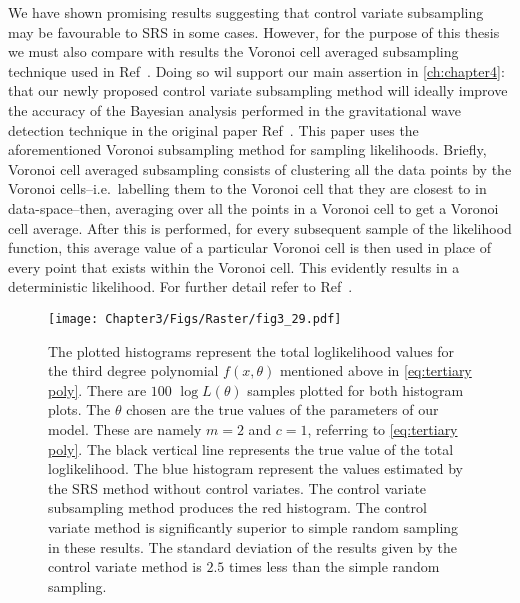 We have shown promising results suggesting that control variate subsampling may be favourable to SRS in some cases. However, for the purpose of this thesis we must also compare with results the Voronoi cell averaged subsampling technique used in Ref~\cite{Mihaylov_2020}. Doing so wil support our main assertion in \cref{ch:chapter4}: that our newly proposed control variate subsampling method will ideally improve the accuracy of the Bayesian analysis performed in the gravitational wave detection technique in the original paper Ref~\cite{Mihaylov_2020}. This paper uses the aforementioned Voronoi subsampling method for sampling likelihoods. Briefly, Voronoi cell averaged subsampling consists of clustering all the data points by the Voronoi cells--i.e.\ labelling them to the Voronoi cell that they are closest to in data-space--then, averaging over all the points in a Voronoi cell to get a Voronoi cell average. After this is performed, for every subsequent sample of the likelihood function, this average value of a particular Voronoi cell is then used in place of every point that exists within the Voronoi cell. This evidently results in a deterministic likelihood. For further detail refer to Ref~\cite{Mihaylov_2020}.


\begin{figure} 
\centering    
\texttt{[image: Chapter3/Figs/Raster/fig3\_29.pdf]}
\caption{ The plotted histograms represent the total loglikelihood values for the third degree polynomial $f(x,\theta)$ mentioned above in \cref{eq:tertiary poly}. There are $100$ $\log L(\theta)$ samples plotted for both histogram plots. The $\theta$ chosen are the true values of the parameters of our model. These are namely $m=2$ and $c=1$, referring to \cref{eq:tertiary poly}. The black vertical line represents the true value of the total loglikelihood. The blue histogram represent the values estimated by the SRS method without control variates. The control variate subsampling method produces the red histogram. The control variate method is significantly superior to simple random sampling in these results. The standard deviation of the results given by the control variate method is $2.5$ times less than the simple random sampling.}
\label{fig:gggh}
\end{figure}

